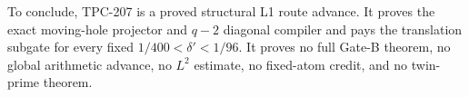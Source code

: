 \documentclass[11pt]{article}
\begin{document}
To conclude, TPC-207 is a proved structural L1 route advance.  It proves the
exact moving-hole projector and $q-2$ diagonal compiler and pays the
translation subgate for every fixed $1/400<\delta'<1/96$.  It proves no full
Gate-B theorem, no global arithmetic advance, no $L^2$ estimate, no
fixed-atom credit, and no twin-prime theorem.



\end{document}
